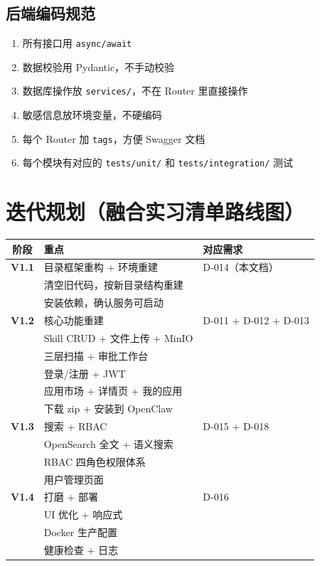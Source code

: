 \documentclass[11pt,a4paper]{article}
\begin{document}
\subsection{后端编码规范}

\begin{enumerate}[nosep]
  \item 所有接口用 \texttt{async/await}
  \item 数据校验用 Pydantic，不手动校验
  \item 数据库操作放 \texttt{services/}，不在 Router 里直接操作
  \item 敏感信息放环境变量，不硬编码
  \item 每个 Router 加 \texttt{tags}，方便 Swagger 文档
  \item 每个模块有对应的 \texttt{tests/unit/} 和 \texttt{tests/integration/} 测试
\end{enumerate}

\section{迭代规划（融合实习清单路线图）}

\begin{table}[h]
\centering
\begin{tabularx}{\linewidth}{clX}
\toprule
\textbf{阶段} & \textbf{重点} & \textbf{对应需求} \\
\midrule
\textbf{V1.1} & 目录框架重构 + 环境重建 & D-014（本文档） \\
& 清空旧代码，按新目录结构重建 & \\
& 安装依赖，确认服务可启动 & \\
\midrule
\textbf{V1.2} & 核心功能重建 & D-011 + D-012 + D-013 \\
& Skill CRUD + 文件上传 + MinIO & \\
& 三层扫描 + 审批工作台 & \\
& 登录/注册 + JWT & \\
& 应用市场 + 详情页 + 我的应用 & \\
& 下载 zip + 安装到 OpenClaw & \\
\midrule
\textbf{V1.3} & 搜索 + RBAC & D-015 + D-018 \\
& OpenSearch 全文 + 语义搜索 & \\
& RBAC 四角色权限体系 & \\
& 用户管理页面 & \\
\midrule
\textbf{V1.4} & 打磨 + 部署 & D-016 \\
& UI 优化 + 响应式 & \\
& Docker 生产配置 & \\
& 健康检查 + 日志 & \\
\bottomrule
\end{tabularx}
\end{table}
\end{document}
